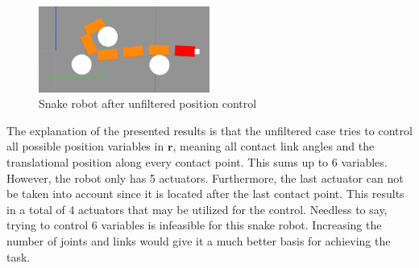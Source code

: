 \begin{figure}
    \centering
    \includegraphics[width=0.5\textwidth]{figures/experiments/single_pos/gazebo_single_pos_nofilter.png}
    \caption{Snake robot after unfiltered position control}
    \label{fig:singlepos-gazebo-nofilter}
\end{figure}
\clearpage
The explanation of the presented results is that the unfiltered case tries to control all possible position variables in $\mathbf{r}$, meaning all contact link angles and the translational position along every contact point. This sums up to 6 variables. However, the robot only has 5 actuators. Furthermore, the last actuator can not be taken into account since it is located after the last contact point. This results in a total of 4 actuators that may be utilized for the control. 
Needless to say, trying to control 6 variables is infeasible for this snake robot. Increasing the number of joints and links would give it a much better basis for achieving the task.






